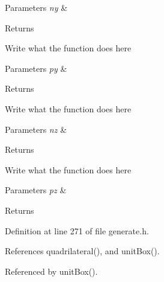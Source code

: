\begin{DoxyParams}{Parameters}
{\em ny} & \\
\hline
\end{DoxyParams}
\begin{DoxyReturn}{Returns}

\end{DoxyReturn}
Write what the function does here


\begin{DoxyParams}{Parameters}
{\em py} & \\
\hline
\end{DoxyParams}
\begin{DoxyReturn}{Returns}

\end{DoxyReturn}
Write what the function does here


\begin{DoxyParams}{Parameters}
{\em nz} & \\
\hline
\end{DoxyParams}
\begin{DoxyReturn}{Returns}

\end{DoxyReturn}
Write what the function does here


\begin{DoxyParams}{Parameters}
{\em pz} & \\
\hline
\end{DoxyParams}
\begin{DoxyReturn}{Returns}

\end{DoxyReturn}


Definition at line 271 of file generate.\+h.



References quadrilateral(), and unit\+Box().



Referenced by unit\+Box().


